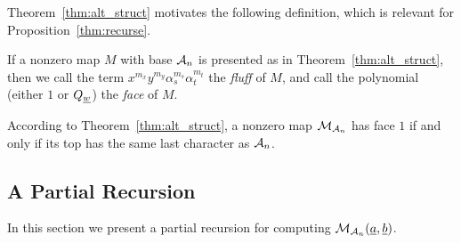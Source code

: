 Theorem~\ref{thm:alt_struct} motivates the following definition, which is relevant for Proposition~\ref{thm:recurse}.
\begin{definition}
	If a nonzero map $M$ with base $\AA_n$ is presented as in Theorem~\ref{thm:alt_struct}, then we call the term $x^{m_x}y^{m_y}\alpha_s^{m_s}\alpha_t^{m_t}$ the \emph{fluff} of $M$, and call the polynomial (either $1$ or $Q_{\ul w}$) the \emph{face} of $M$. 
\end{definition}
\begin{remark*}
	According to Theorem~\ref{thm:alt_struct}, a nonzero map $\MM_{\AA_n}$ has face $1$ if and only if its top has the same last character as $\AA_n$.
\end{remark*}

\subsection{A Partial Recursion}
In this section we present a partial recursion for computing $\MM_{\AA_n}(\ul a, \ul b)$.  

